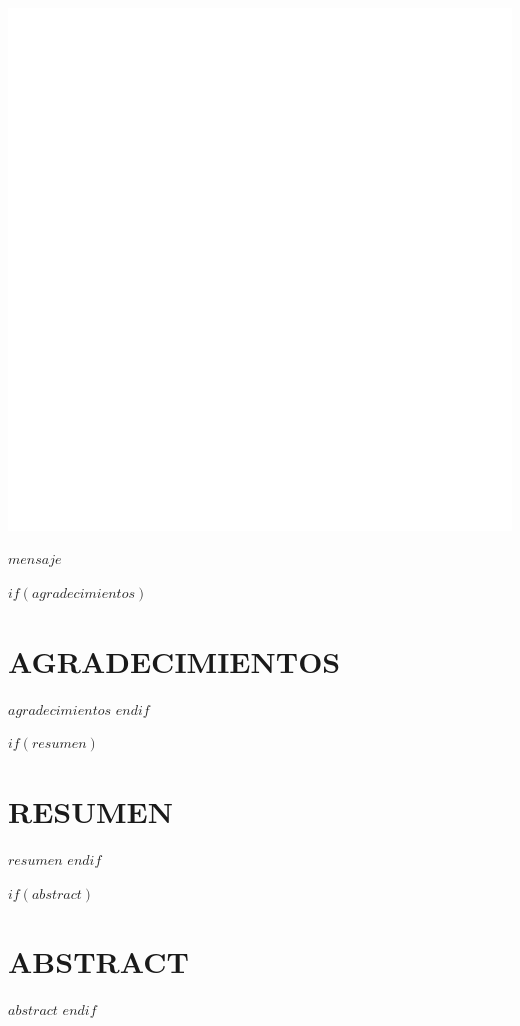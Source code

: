 \documentclass[$if(fontsize)$$fontsize$,$endif$$if(lang)$$babel-lang$,$endif$$if(papersize)$$papersize$paper,$endif$$for(classoption)$$classoption$$sep$,$endfor$]{$documentclass$}
\begin{document}
\begin{flushright}
\large{\emph{}}
\end{flushright}
\begin{center}
\includegraphics{images/portada.pdf}
\end{center}



%
\begin{flushright}
\large{\emph{$mensaje$}}
\end{flushright}
%
\cleardoublepage



$if(agradecimientos)$
\chapter*{AGRADECIMIENTOS}
$agradecimientos$
\cleardoublepage
$endif$

$if(resumen)$
\chapter*{RESUMEN}
$resumen$
\cleardoublepage
$endif$

$if(abstract)$
\chapter*{ABSTRACT}
$abstract$
\cleardoublepage
$endif$
\end{document}

